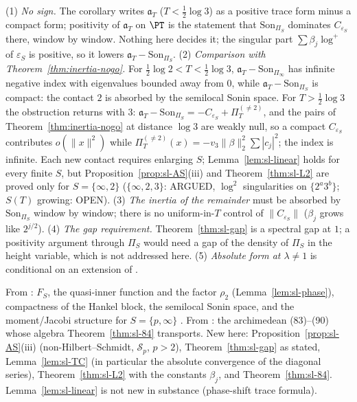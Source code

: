 \begin{remark}\label{rem:sl-not}
(1) \emph{No sign.} The corollary writes $\mathfrak a_T$ ($T<\frac12\log3$) as a positive trace form minus a compact
form; positivity of $\mathfrak a_T$ on $\PT$ is the statement that $\mathrm{Son}_{\Pi_S}$ dominates
$C_{\varepsilon_S}$ there, window by window. Nothing here decides it; the singular part
$\sum\beta_j\log^+$ of $\varepsilon_S$ is positive, so it lowers $\mathfrak a_T-\mathrm{Son}_{\Pi_S}$.
(2) \emph{Comparison with Theorem~\ref{thm:inertia-nogo}.} For $\frac12\log2<T<\frac12\log3$,
$\mathfrak a_T-\mathrm{Son}_{\Pi_\infty}$ has infinite negative index with eigenvalues bounded away from $0$, while
$\mathfrak a_T-\mathrm{Son}_{\Pi_S}$ is compact: the contact $2$ is absorbed by the semilocal Sonin space. For
$T>\frac12\log3$ the obstruction returns with $3$: $\mathfrak a_T-\mathrm{Son}_{\Pi_S}=-C_{\varepsilon_S}+\Pi^{(\ne2)}_T$,
and the pairs of Theorem~\ref{thm:inertia-nogo} at distance $\log3$ are weakly null, so a compact $C_{\varepsilon_S}$
contributes $o(\|x\|^2)$ while $\Pi^{(\ne2)}_T(x)=-v_3\|\beta\|_2^2\sum|c_j|^2$; the index is infinite. Each new contact
requires enlarging $S$; Lemma~\ref{lem:sl-linear} holds for every finite $S$, but
Proposition~\ref{prop:sl-AS}(iii) and Theorem~\ref{thm:sl-L2} are proved only for $S=\{\infty,2\}$
($\{\infty,2,3\}$: ARGUED, $\log^2$ singularities on $\{2^a3^b\}$; $S(T)$ growing: OPEN).
(3) \emph{The inertia of the remainder} must be absorbed by $\mathrm{Son}_{\Pi_S}$ window by window; there is no
uniform-in-$T$ control of $\|C_{\varepsilon_S}\|$ ($\beta_j$ grows like $2^{j/2}$).
(4) \emph{The gap requirement.} Theorem~\ref{thm:sl-gap} is a spectral gap at $1$; a positivity argument through
$\Pi_S$ would need a gap of the density of $\Pi_S$ in the height variable, which is not addressed here.
(5) \emph{Absolute form at $\lambda\ne1$} is conditional on an extension of \cite[Thm.~4.7]{ConnesConsani2021}.
\end{remark}

\begin{remark}[attribution]\label{rem:sl-new}
From \cite{CCquasi2020,CCM2023,CCM2024}: $F_S$, the quasi-inner function and the factor $\rho_2$
(Lemma~\ref{lem:sl-phase}), compactness of the Hankel block, the semilocal Sonin space, and the moment/Jacobi
structure for $S=\{p,\infty\}$ \cite{CCM2024}. From \cite{ConnesConsani2021}: the archimedean (83)--(90) whose
algebra Theorem~\ref{thm:sl-84} transports. New here: Proposition~\ref{prop:sl-AS}(iii) (non-Hilbert--Schmidt,
$\mathcal S_p$, $p>2$), Theorem~\ref{thm:sl-gap} as stated, Lemma~\ref{lem:sl-TC} (in particular the absolute
convergence of the diagonal series), Theorem~\ref{thm:sl-L2} with the constants $\beta_j$, and
Theorem~\ref{thm:sl-84}. Lemma~\ref{lem:sl-linear} is not new in substance (phase-shift trace formula).
\end{remark}
